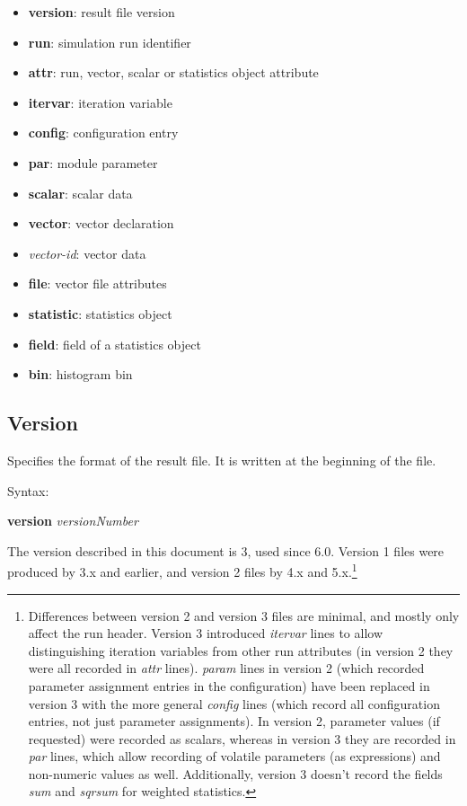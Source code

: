 \begin{itemize}
    \item \textbf{version}: result file version
    \item \textbf{run}: simulation run identifier
    \item \textbf{attr}: run, vector, scalar or statistics object attribute
    \item \textbf{itervar}: iteration variable
    \item \textbf{config}: configuration entry
    \item \textbf{par}: module parameter
    \item \textbf{scalar}: scalar data
    \item \textbf{vector}: vector declaration
    \item \textit{vector-id}: vector data
    \item \textbf{file}: vector file attributes
    \item \textbf{statistic}: statistics object
    \item \textbf{field}: field of a statistics object
    \item \textbf{bin}: histogram bin
\end{itemize}


\subsection{Version}
\label{sec:result-file-formats:opp:version}

Specifies the format of the result file. It is written at the beginning of the file.

Syntax:

\hspace{20mm} \textbf{version} \textit{versionNumber}

The version described in this document is 3, used since {\omnetpp} 6.0.
Version 1 files were produced by {\omnetpp} 3.x and earlier, and version 2
files by {\omnetpp} 4.x and 5.x.\footnote{
    Differences between version 2 and version 3 files are minimal, and mostly only
    affect the run header. Version 3 introduced \textit{itervar} lines to allow
    distinguishing iteration variables from other run attributes (in version 2 they
    were all recorded in \textit{attr} lines). \textit{param} lines in version 2
    (which recorded parameter assignment entries in the configuration) have been
    replaced in version 3 with the more general \textit{config} lines (which record
    all configuration entries, not just parameter assignments). In version 2,
    parameter values (if requested) were recorded as scalars, whereas in version 3
    they are recorded in \textit{par} lines, which allow recording of volatile
    parameters (as expressions) and non-numeric values as well. Additionally,
    version 3 doesn't record the fields \textit{sum} and \textit{sqrsum}
    for weighted statistics.
}



